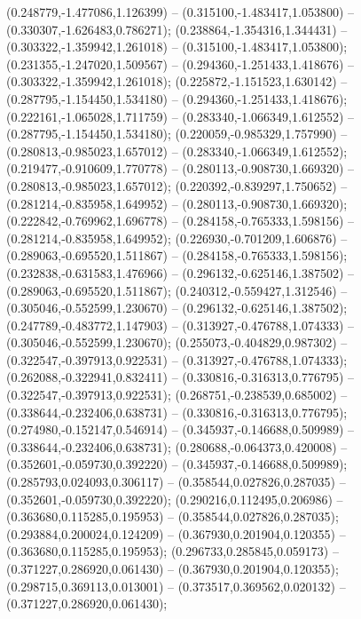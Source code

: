  (0.248779,-1.477086,1.126399) -- (0.315100,-1.483417,1.053800) -- (0.330307,-1.626483,0.786271);
 (0.238864,-1.354316,1.344431) -- (0.303322,-1.359942,1.261018) -- (0.315100,-1.483417,1.053800);
 (0.231355,-1.247020,1.509567) -- (0.294360,-1.251433,1.418676) -- (0.303322,-1.359942,1.261018);
 (0.225872,-1.151523,1.630142) -- (0.287795,-1.154450,1.534180) -- (0.294360,-1.251433,1.418676);
 (0.222161,-1.065028,1.711759) -- (0.283340,-1.066349,1.612552) -- (0.287795,-1.154450,1.534180);
 (0.220059,-0.985329,1.757990) -- (0.280813,-0.985023,1.657012) -- (0.283340,-1.066349,1.612552);
 (0.219477,-0.910609,1.770778) -- (0.280113,-0.908730,1.669320) -- (0.280813,-0.985023,1.657012);
 (0.220392,-0.839297,1.750652) -- (0.281214,-0.835958,1.649952) -- (0.280113,-0.908730,1.669320);
 (0.222842,-0.769962,1.696778) -- (0.284158,-0.765333,1.598156) -- (0.281214,-0.835958,1.649952);
 (0.226930,-0.701209,1.606876) -- (0.289063,-0.695520,1.511867) -- (0.284158,-0.765333,1.598156);
 (0.232838,-0.631583,1.476966) -- (0.296132,-0.625146,1.387502) -- (0.289063,-0.695520,1.511867);
 (0.240312,-0.559427,1.312546) -- (0.305046,-0.552599,1.230670) -- (0.296132,-0.625146,1.387502);
 (0.247789,-0.483772,1.147903) -- (0.313927,-0.476788,1.074333) -- (0.305046,-0.552599,1.230670);
 (0.255073,-0.404829,0.987302) -- (0.322547,-0.397913,0.922531) -- (0.313927,-0.476788,1.074333);
 (0.262088,-0.322941,0.832411) -- (0.330816,-0.316313,0.776795) -- (0.322547,-0.397913,0.922531);
 (0.268751,-0.238539,0.685002) -- (0.338644,-0.232406,0.638731) -- (0.330816,-0.316313,0.776795);
 (0.274980,-0.152147,0.546914) -- (0.345937,-0.146688,0.509989) -- (0.338644,-0.232406,0.638731);
 (0.280688,-0.064373,0.420008) -- (0.352601,-0.059730,0.392220) -- (0.345937,-0.146688,0.509989);
 (0.285793,0.024093,0.306117) -- (0.358544,0.027826,0.287035) -- (0.352601,-0.059730,0.392220);
 (0.290216,0.112495,0.206986) -- (0.363680,0.115285,0.195953) -- (0.358544,0.027826,0.287035);
 (0.293884,0.200024,0.124209) -- (0.367930,0.201904,0.120355) -- (0.363680,0.115285,0.195953);
 (0.296733,0.285845,0.059173) -- (0.371227,0.286920,0.061430) -- (0.367930,0.201904,0.120355);
 (0.298715,0.369113,0.013001) -- (0.373517,0.369562,0.020132) -- (0.371227,0.286920,0.061430);
